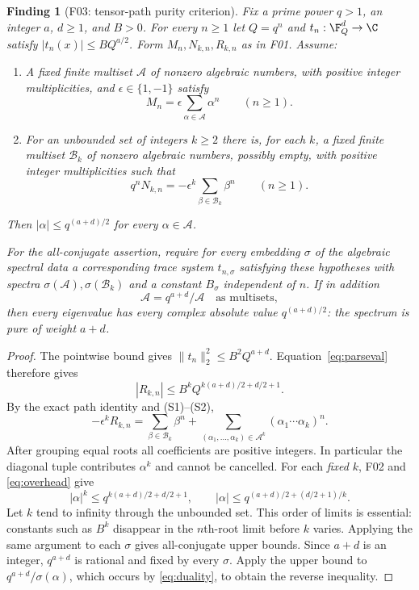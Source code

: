 \documentclass[11pt,a4paper]{article}
\newcommand{\fid}[1]{\textsf{#1}}\newcommand{\gate}[1]{\textsf{#1}}
\theoremstyle{named}\newtheorem{finding}{Finding}[section]
\theoremstyle{definition}\newtheorem{definition}[finding]{Definition}
\theoremstyle{remark}\newtheorem{remark}[finding]{Remark}
\begin{document}
\begin{finding}[\fid{F03}: tensor-path purity criterion]\label{f:criterion}
Fix a prime power $q>1$, an integer $a$, $d\ge1$, and $B>0$. For every $n\ge1$ let $Q=q^n$ and $t_n:\F_Q^d\to\C$ satisfy $|t_n(x)|\le BQ^{a/2}$. Form $M_n,N_{k,n},R_{k,n}$ as in \fid{F01}. Assume:
\begin{enumerate}[label=(S\arabic*)]
\item A fixed finite multiset $\mathcal A$ of nonzero algebraic numbers, with positive integer multiplicities, and $\epsilon\in\{1,-1\}$ satisfy
\[
 M_n=\epsilon\sum_{\alpha\in\mathcal A}\alpha^n\qquad(n\ge1).
\]
\item For an unbounded set of integers $k\ge2$ there is, for each $k$, a fixed finite multiset $\mathcal B_k$ of nonzero algebraic numbers, possibly empty, with positive integer multiplicities such that
\[
 q^nN_{k,n}=-\epsilon^k\sum_{\beta\in\mathcal B_k}\beta^n\qquad(n\ge1).
\]
\end{enumerate}
Then $|\alpha|\le q^{(a+d)/2}$ for every $\alpha\in\mathcal A$.

For the all-conjugate assertion, require for every embedding $\sigma$ of the algebraic spectral data a corresponding trace system $t_{n,\sigma}$ satisfying these hypotheses with spectra $\sigma(\mathcal A),\sigma(\mathcal B_k)$ and a constant $B_\sigma$ independent of $n$. If in addition
\begin{equation}\label{eq:duality}
 \mathcal A=q^{a+d}/\mathcal A
 \quad\text{as multisets},
\end{equation}
then every eigenvalue has every complex absolute value $q^{(a+d)/2}$: the spectrum is pure of weight $a+d$.
\end{finding}
\begin{proof}
The pointwise bound gives $\|t_n\|_2^2\le B^2Q^{a+d}$. Equation~\eqref{eq:parseval} therefore gives
\begin{equation}\label{eq:overhead}
 |R_{k,n}|\le B^kQ^{k(a+d)/2+d/2+1}.
\end{equation}
By the exact path identity and (S1)--(S2),
\begin{equation}\label{eq:positivespectrum}
 -\epsilon^kR_{k,n}=
 \sum_{\beta\in\mathcal B_k}\beta^n+
 \sum_{(\alpha_1,\ldots,\alpha_k)\in\mathcal A^k}
 (\alpha_1\cdots\alpha_k)^n.
\end{equation}
After grouping equal roots all coefficients are positive integers. In particular the diagonal tuple contributes $\alpha^k$ and cannot be cancelled. For each \emph{fixed} $k$, \fid{F02} and \eqref{eq:overhead} give
\[
 |\alpha|^k\le q^{k(a+d)/2+d/2+1},\qquad
 |\alpha|\le q^{(a+d)/2+(d/2+1)/k}.
\]
Let $k$ tend to infinity through the unbounded set. This order of limits is essential: constants such as $B^k$ disappear in the $n$th-root limit before $k$ varies. Applying the same argument to each $\sigma$ gives all-conjugate upper bounds. Since $a+d$ is an integer, $q^{a+d}$ is rational and fixed by every $\sigma$. Apply the upper bound to $q^{a+d}/\sigma(\alpha)$, which occurs by \eqref{eq:duality}, to obtain the reverse inequality.
\end{proof}
\end{document}

